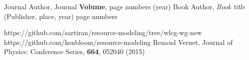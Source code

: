 \begin{thebibliography}{}
Journal Author, Journal \textbf{Volume}, page numbers (year)
Book Author, \textit{Book title} (Publisher, place, year) page numbers

https://github.com/sartiran/resource-modeling/tree/wlcg-wg-new
https://github.com/kenbloom/resource-modeling
Renaud Vernet, Journal of Physics: Conference Series, \textbf{664}, 052040 (2015)


\end{thebibliography}
